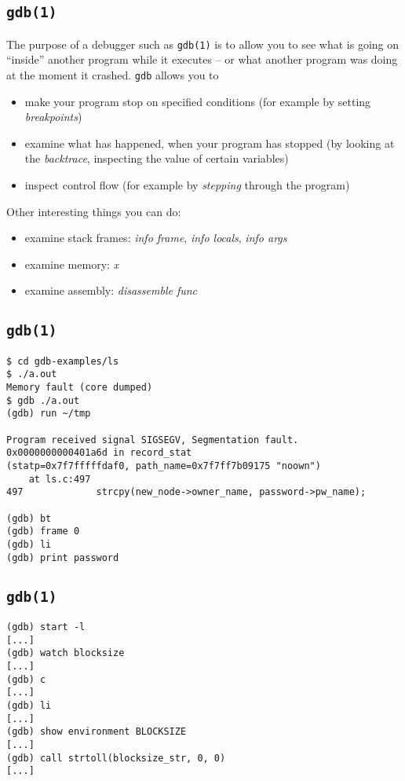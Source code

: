 \documentclass[xga]{xdvislides}
\begin{document}
\subsection{{\tt gdb(1)}}

The purpose of a debugger such as {\tt gdb(1)} is to allow you to see what is
going on ``inside'' another program while it executes -- or what another
program was doing at the moment it crashed. {\tt gdb} allows you to

\begin{itemize}
	\item make your program stop on specified conditions (for example by
		setting {\em breakpoints})
	\item examine what has happened, when your program has stopped (by looking
		at the {\em backtrace}, inspecting the value of certain variables)
	\item inspect control flow (for example by {\em stepping} through the
		program)
\end{itemize}
\vspace{.25in}
Other interesting things you can do:

\begin{itemize}
	\item examine stack frames: {\em info frame}, {\em info locals}, {\em info
		args}
	\item examine memory: {\em x}
	\item examine assembly: {\em disassemble func}
\end{itemize}


\subsection{{\tt gdb(1)}}
\begin{verbatim}
$ cd gdb-examples/ls
$ ./a.out
Memory fault (core dumped)
$ gdb ./a.out
(gdb) run ~/tmp

Program received signal SIGSEGV, Segmentation fault.
0x0000000000401a6d in record_stat
(statp=0x7f7fffffdaf0, path_name=0x7f7ff7b09175 "noown")
    at ls.c:497
497             strcpy(new_node->owner_name, password->pw_name);

(gdb) bt
(gdb) frame 0
(gdb) li
(gdb) print password
\end{verbatim}

\subsection{{\tt gdb(1)}}
\begin{verbatim}
(gdb) start -l
[...]
(gdb) watch blocksize
[...]
(gdb) c
[...]
(gdb) li
[...]
(gdb) show environment BLOCKSIZE
[...]
(gdb) call strtoll(blocksize_str, 0, 0)
[...]
\end{verbatim}
\end{document}
